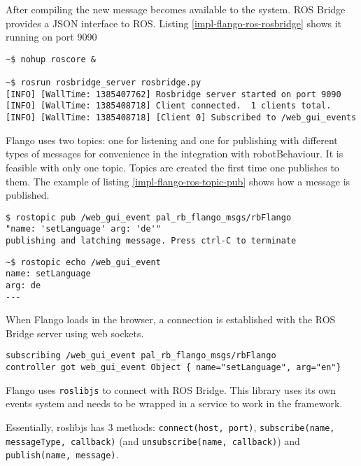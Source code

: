 After compiling the new message becomes available to the system.
ROS Bridge provides a \ac{JSON} interface to \ac{ROS}. Listing \ref{impl-flango-ros-rosbridge} shows it running on port 9090

\begin{lstlisting}[caption=ROS Bridge running, label=impl-flango-ros-rosbridge]
~$ nohup roscore &

~$ rosrun rosbridge_server rosbridge.py 
[INFO] [WallTime: 1385407762] Rosbridge server started on port 9090
[INFO] [WallTime: 1385408718] Client connected.  1 clients total.
[INFO] [WallTime: 1385408718] [Client 0] Subscribed to /web_gui_events
\end{lstlisting}

Flango \cm uses two topics: one for listening and one for publishing with different types of messages for convenience in the integration with robotBehaviour.
It is feasible with only one topic.
Topics are created the first time one publishes to them.
The example of listing \ref{impl-flango-ros-topic-pub} shows how a message is published.

\begin{lstlisting}[caption=Publishing to a topic, label=impl-flango-ros-topic-pub]
$ rostopic pub /web_gui_event pal_rb_flango_msgs/rbFlango 
"name: 'setLanguage' arg: 'de'" 
publishing and latching message. Press ctrl-C to terminate
\end{lstlisting}

\begin{lstlisting}[caption=Listening to a topic, label=impl-flango-ros-topic-echo]
~$ rostopic echo /web_gui_event
name: setLanguage
arg: de
---
\end{lstlisting}

When Flango \cm loads in the browser, a connection is established with the ROS Bridge server using web sockets.
\begin{lstlisting}[caption=Listening to a topic (Browser Console), label=impl-flango-ros-topic-browser]
subscribing /web_gui_event pal_rb_flango_msgs/rbFlango
controller got web_gui_event Object { name="setLanguage", arg="en"}
\end{lstlisting}

Flango \cm uses \texttt{roslibjs} to connect with ROS Bridge.
This library uses its own events system and needs to be wrapped in a service to work in the framework.

Essentially, roslibjs has 3 methods: \texttt{connect(host, port)}, \texttt{subscribe(name, messageType, callback)} (and \texttt{unsubscribe(name, callback)}) and \texttt{publish(name, message)}.

